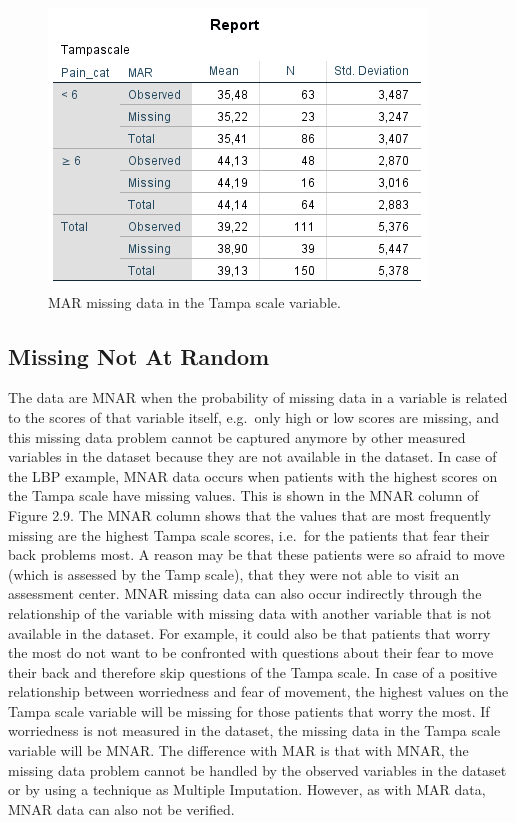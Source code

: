 \documentclass[]{book}
\begin{document}
\begin{figure}

{\centering \includegraphics[width=0.9\linewidth]{images/tab2.3} 

}

\caption{MAR missing data in the Tampa scale variable.}\label{fig:tab34}
\end{figure}

\subsection{Missing Not At Random}\label{missing-not-at-random}

The data are MNAR when the probability of missing data in a variable is
related to the scores of that variable itself, e.g.~only high or low
scores are missing, and this missing data problem cannot be captured
anymore by other measured variables in the dataset because they are not
available in the dataset. In case of the LBP example, MNAR data occurs
when patients with the highest scores on the Tampa scale have missing
values. This is shown in the MNAR column of Figure 2.9. The MNAR column
shows that the values that are most frequently missing are the highest
Tampa scale scores, i.e.~for the patients that fear their back problems
most. A reason may be that these patients were so afraid to move (which
is assessed by the Tamp scale), that they were not able to visit an
assessment center. MNAR missing data can also occur indirectly through
the relationship of the variable with missing data with another variable
that is not available in the dataset. For example, it could also be that
patients that worry the most do not want to be confronted with questions
about their fear to move their back and therefore skip questions of the
Tampa scale. In case of a positive relationship between worriedness and
fear of movement, the highest values on the Tampa scale variable will be
missing for those patients that worry the most. If worriedness is not
measured in the dataset, the missing data in the Tampa scale variable
will be MNAR. The difference with MAR is that with MNAR, the missing
data problem cannot be handled by the observed variables in the dataset
or by using a technique as Multiple Imputation. However, as with MAR
data, MNAR data can also not be verified.
\end{document}
